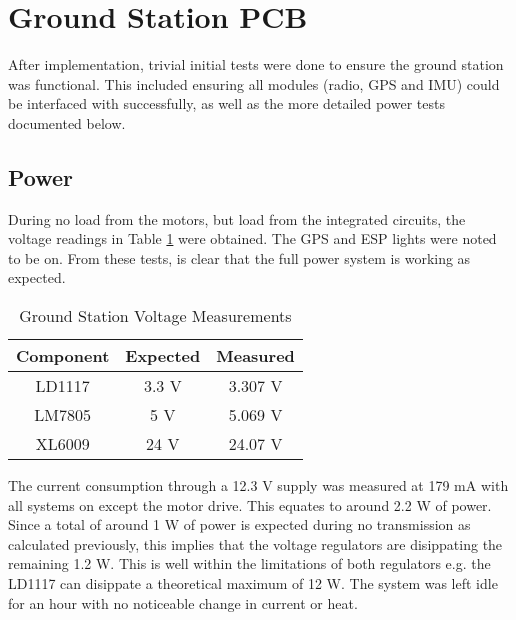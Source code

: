 \section{Ground Station PCB}

After implementation, trivial initial tests were done to ensure the ground station was functional. This included ensuring all modules (radio, GPS and IMU) could be interfaced with successfully, as well as the more detailed power tests documented below.

\subsection{Power}

During no load from the motors, but load from the integrated circuits, the voltage readings in Table \ref{tab:gs_pcb_voltage} were obtained. The GPS and ESP lights were noted to be on. From these tests, is clear that the full power system is working as expected.
\begin{table}[!htb]
  \centering
  \renewcommand{\arraystretch}{1.2}
  \begin{tabular}{ |c|c|c| }
  \hline
  \textbf{Component}        & \textbf{Expected}     & \textbf{Measured}  \\
  \hline
  LD1117                 &  3.3 V             & 3.307 V \\  \hline
  LM7805                 &  5 V               & 5.069 V \\  \hline
  XL6009                 &  24 V             & 24.07 V  \\ \hline
  \end{tabular}
  \caption{Ground Station Voltage Measurements}
  \label{tab:gs_pcb_voltage}
\end{table}

The current consumption through a 12.3 V supply was measured at 179 mA with all systems on except the motor drive. This equates to around 2.2 W of power. Since a total of around 1 W of power is expected during no transmission as calculated previously, this implies that the voltage regulators are disippating the remaining 1.2 W. This is well within the limitations of both regulators e.g. the LD1117 can disippate a theoretical maximum of 12 W. The system was left idle for an hour with no noticeable change in current or heat.

